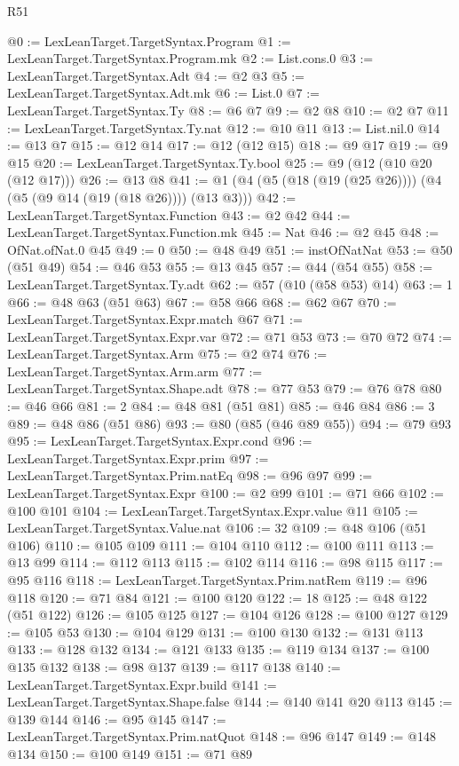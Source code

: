 \begin{lexlean}{R51}
\begin{coremodule}
@0 := LexLeanTarget.TargetSyntax.Program
@1 := LexLeanTarget.TargetSyntax.Program.mk
@2 := List.cons.{0}
@3 := LexLeanTarget.TargetSyntax.Adt
@4 := @2 @3
@5 := LexLeanTarget.TargetSyntax.Adt.mk
@6 := List.{0}
@7 := LexLeanTarget.TargetSyntax.Ty
@8 := @6 @7
@9 := @2 @8
@10 := @2 @7
@11 := LexLeanTarget.TargetSyntax.Ty.nat
@12 := @10 @11
@13 := List.nil.{0}
@14 := @13 @7
@15 := @12 @14
@17 := @12 (@12 @15)
@18 := @9 @17
@19 := @9 @15
@20 := LexLeanTarget.TargetSyntax.Ty.bool
@25 := @9 (@12 (@10 @20 (@12 @17)))
@26 := @13 @8
@41 := @1 (@4 (@5 (@18 (@19 (@25 @26)))) (@4 (@5 (@9 @14 (@19 (@18 @26)))) (@13 @3)))
@42 := LexLeanTarget.TargetSyntax.Function
@43 := @2 @42
@44 := LexLeanTarget.TargetSyntax.Function.mk
@45 := Nat
@46 := @2 @45
@48 := OfNat.ofNat.{0} @45
@49 := 0
@50 := @48 @49
@51 := instOfNatNat
@53 := @50 (@51 @49)
@54 := @46 @53
@55 := @13 @45
@57 := @44 (@54 @55)
@58 := LexLeanTarget.TargetSyntax.Ty.adt
@62 := @57 (@10 (@58 @53) @14)
@63 := 1
@66 := @48 @63 (@51 @63)
@67 := @58 @66
@68 := @62 @67
@70 := LexLeanTarget.TargetSyntax.Expr.match @67
@71 := LexLeanTarget.TargetSyntax.Expr.var
@72 := @71 @53
@73 := @70 @72
@74 := LexLeanTarget.TargetSyntax.Arm
@75 := @2 @74
@76 := LexLeanTarget.TargetSyntax.Arm.arm
@77 := LexLeanTarget.TargetSyntax.Shape.adt
@78 := @77 @53
@79 := @76 @78
@80 := @46 @66
@81 := 2
@84 := @48 @81 (@51 @81)
@85 := @46 @84
@86 := 3
@89 := @48 @86 (@51 @86)
@93 := @80 (@85 (@46 @89 @55))
@94 := @79 @93
@95 := LexLeanTarget.TargetSyntax.Expr.cond
@96 := LexLeanTarget.TargetSyntax.Expr.prim
@97 := LexLeanTarget.TargetSyntax.Prim.natEq
@98 := @96 @97
@99 := LexLeanTarget.TargetSyntax.Expr
@100 := @2 @99
@101 := @71 @66
@102 := @100 @101
@104 := LexLeanTarget.TargetSyntax.Expr.value @11
@105 := LexLeanTarget.TargetSyntax.Value.nat
@106 := 32
@109 := @48 @106 (@51 @106)
@110 := @105 @109
@111 := @104 @110
@112 := @100 @111
@113 := @13 @99
@114 := @112 @113
@115 := @102 @114
@116 := @98 @115
@117 := @95 @116
@118 := LexLeanTarget.TargetSyntax.Prim.natRem
@119 := @96 @118
@120 := @71 @84
@121 := @100 @120
@122 := 18
@125 := @48 @122 (@51 @122)
@126 := @105 @125
@127 := @104 @126
@128 := @100 @127
@129 := @105 @53
@130 := @104 @129
@131 := @100 @130
@132 := @131 @113
@133 := @128 @132
@134 := @121 @133
@135 := @119 @134
@137 := @100 @135 @132
@138 := @98 @137
@139 := @117 @138
@140 := LexLeanTarget.TargetSyntax.Expr.build
@141 := LexLeanTarget.TargetSyntax.Shape.false
@144 := @140 @141 @20 @113
@145 := @139 @144
@146 := @95 @145
@147 := LexLeanTarget.TargetSyntax.Prim.natQuot
@148 := @96 @147
@149 := @148 @134
@150 := @100 @149
@151 := @71 @89

\end{coremodule}
\end{lexlean}
